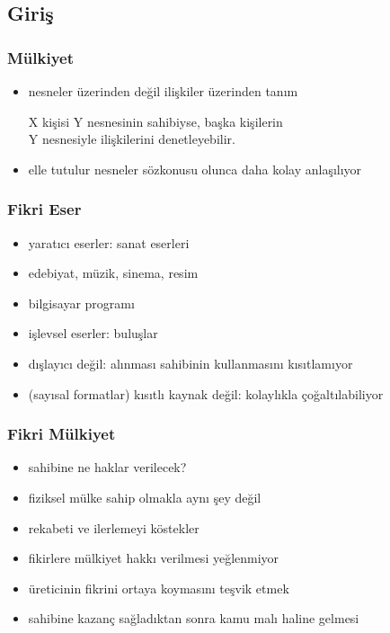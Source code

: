 \documentclass[dvipsnames]{beamer}
\theoremstyle{plain}
\begin{document}
\subsection{Giriş}

\begin{frame}
  \frametitle{Mülkiyet}

  \begin{itemize}
    \item nesneler üzerinden değil ilişkiler üzerinden tanım

    \medskip
    X kişisi Y nesnesinin sahibiyse, başka kişilerin\\
    Y nesnesiyle ilişkilerini denetleyebilir.

    \medskip
    \item elle tutulur nesneler sözkonusu olunca daha kolay anlaşılıyor
  \end{itemize}
\end{frame}

\begin{frame}
  \frametitle{Fikri Eser}

  \begin{itemize}
    \item yaratıcı eserler: sanat eserleri
    \item edebiyat, müzik, sinema, resim
    \item bilgisayar programı

    \medskip
    \item işlevsel eserler: buluşlar
  \end{itemize}

  \pause
  \bigskip
  \begin{itemize}
    \item dışlayıcı değil: alınması sahibinin kullanmasını kısıtlamıyor

    \medskip
    \item (sayısal formatlar) kısıtlı kaynak değil: kolaylıkla çoğaltılabiliyor
  \end{itemize}
\end{frame}

\begin{frame}
  \frametitle{Fikri Mülkiyet}

  \begin{itemize}
    \item sahibine ne haklar verilecek?
    \smallskip
    \item fiziksel mülke sahip olmakla aynı şey değil
    \item rekabeti ve ilerlemeyi köstekler

    \pause
    \bigskip
    \item fikirlere mülkiyet hakkı verilmesi yeğlenmiyor
    \smallskip
    \item üreticinin fikrini ortaya koymasını teşvik etmek
    \item sahibine kazanç sağladıktan sonra kamu malı haline gelmesi
  \end{itemize}
\end{frame}
\end{document}
